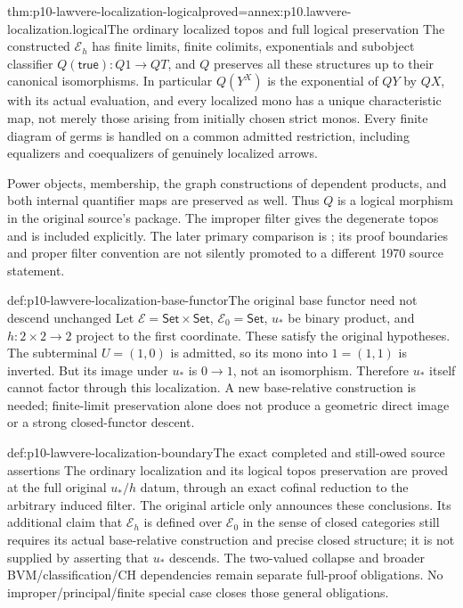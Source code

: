 \begin{hbtheorem}{thm:p10-lawvere-localization-logical}{proved=annex:p10.lawvere-localization.logical}{The ordinary localized topos and full logical preservation}
The constructed \(\mathcal E_h\) has finite limits,
finite colimits, exponentials and subobject classifier
\(Q(\mathsf{true}):Q1\to QT\), and \(Q\) preserves
all these structures up to their canonical isomorphisms.
In particular \(Q(Y^X)\) is the exponential of
\(QY\) by \(QX\), with its actual evaluation, and
every localized mono has a unique characteristic map,
not merely those arising from initially chosen strict
monos.  Every finite diagram of germs is handled on
a common admitted restriction, including equalizers
and coequalizers of genuinely localized arrows.

Power objects, membership, the graph constructions of
dependent products, and both internal quantifier maps
are preserved as well.  Thus \(Q\) is a logical
morphism in the original source's package.  The
improper filter gives the degenerate topos and is
included explicitly.  The later primary comparison is
\cite[V\S9, Theorem~2 and Lemma~3, pp.~261--263]
{MacLaneMoerdijk1992}; its proof boundaries and proper
filter convention are not silently promoted to a
different 1970 source statement.
\end{hbtheorem}

\begin{hbexample}{def:p10-lawvere-localization-base-functor}{The original base functor need not descend unchanged}
Let \(\mathcal E=\mathsf{Set}\times\mathsf{Set}\),
\(\mathcal E_0=\mathsf{Set}\), \(u_*\) be binary
product, and \(h:2\times2\to2\) project to the first
coordinate.  These satisfy the original hypotheses.
The subterminal \(U=(1,0)\) is admitted, so its mono
into \(1=(1,1)\) is inverted.  But its image under
\(u_*\) is \(0\to1\), not an isomorphism.
Therefore \(u_*\) itself cannot factor through this
localization.  A new base-relative construction is
needed; finite-limit preservation alone does not
produce a geometric direct image or a strong
closed-functor descent.
\end{hbexample}

\begin{proofboundary}{def:p10-lawvere-localization-boundary}{The exact completed and still-owed source assertions}
The ordinary localization and its logical topos
preservation are proved at the full original \(u_* / h\)
datum, through an exact cofinal reduction to the
arbitrary induced filter.  The original article only
announces these conclusions.  Its additional claim
that \(\mathcal E_h\) is defined over \(\mathcal E_0\)
in the sense of closed categories still requires its
actual base-relative construction and precise closed
structure; it is not supplied by asserting that
\(u_*\) descends.  The two-valued collapse and broader
BVM/classification/CH dependencies remain separate
full-proof obligations.  No improper/principal/finite
special case closes those general obligations.
\end{proofboundary}
